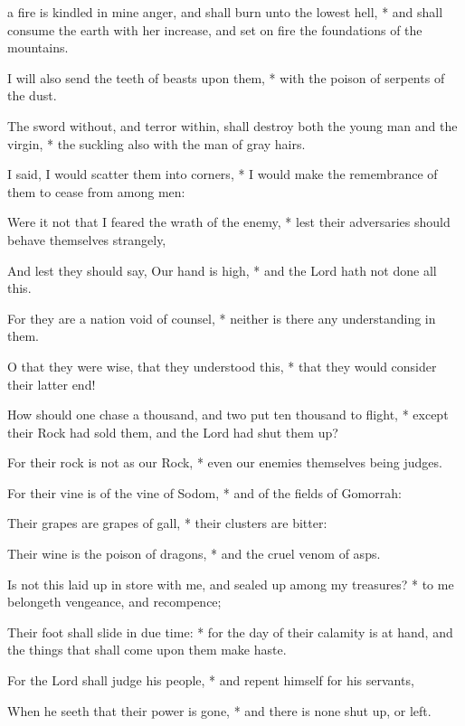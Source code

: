\begin{multicols}{2}
 a fire is kindled in mine anger, {\dag} and shall burn unto the lowest hell, * and shall consume the earth with her increase, and set on fire the foundations of the mountains.\par
{}
I will also send the teeth of beasts upon them, * with the poison of serpents of the dust.\par
The sword without, and terror within, {\dag} shall destroy both the young man and the virgin, * the suckling also with the man of gray hairs.\par
I said, I would scatter them into corners, * I would make the remembrance of them to cease from among men:\par
Were it not that I feared the wrath of the enemy, * lest their adversaries should behave themselves strangely,\par
And lest they should say, Our hand is high, * and the Lord hath not done all this.\par
For they are a nation void of counsel, * neither is there any understanding in them.\par
O that they were wise, that they understood this, * that they would consider their latter end!\par
How should one chase a thousand, {\dag} and two put ten thousand to flight, * except their Rock had sold them, and the Lord had shut them up?\par
For their rock is not as our Rock, * even our enemies themselves being judges.\par
For their vine is of the vine of Sodom, * and of the fields of Gomorrah:\par
Their grapes are grapes of gall, * their clusters are bitter:\par
Their wine is the poison of dragons, * and the cruel venom of asps.\par
Is not this laid up in store with me, {\dag} and sealed up among my treasures? * to me belongeth vengeance, and recompence;\par
Their foot shall slide in due time: * for the day of their calamity is at hand, and the things that shall come upon them make haste.\par
For the Lord shall judge his people, * and repent himself for his servants,\par
When he seeth that their power is gone, * and there is none shut up, or left.\par

\end{multicols}
